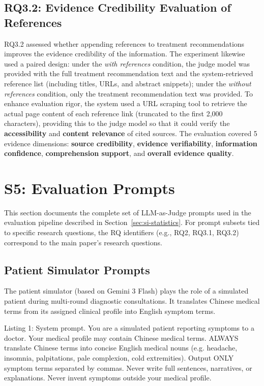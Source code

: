 \documentclass[12pt]{article}
\begin{document}
\subsection{RQ3.2: Evidence Credibility Evaluation of References}

RQ3.2 assessed whether appending references to treatment recommendations improves the evidence credibility of the information.
The experiment likewise used a paired design: under the \textit{with references} condition,
the judge model was provided with the full treatment recommendation text and the system-retrieved reference list
(including titles, URLs, and abstract snippets);
under the \textit{without references} condition, only the treatment recommendation text was provided.
To enhance evaluation rigor, the system used a URL scraping tool to retrieve the actual page content of each reference link
(truncated to the first 2,000 characters), providing this to the judge model
so that it could verify the \textbf{accessibility} and \textbf{content relevance} of cited sources.
The evaluation covered 5 evidence dimensions: \textbf{source credibility}, \textbf{evidence verifiability},
\textbf{information confidence}, \textbf{comprehension support}, and \textbf{overall evidence quality}.

\section{S5: Evaluation Prompts}
\label{sec:si-eval-prompts}

This section documents the complete set of LLM-as-Judge prompts used in the evaluation pipeline described in Section~\ref{sec:si-statistics}. For prompt subsets tied to specific research questions, the RQ identifiers (e.g., RQ2, RQ3.1, RQ3.2) correspond to the main paper's research questions.

\subsection{Patient Simulator Prompts}
The patient simulator (based on Gemini 3 Flash) plays the role of a simulated patient during multi-round diagnostic consultations. It translates Chinese medical terms from its assigned clinical profile into English symptom terms.

\begin{promptbox}{Listing 1: System prompt.}
You are a simulated patient reporting symptoms to a doctor. Your
medical profile may contain Chinese medical terms. ALWAYS translate
Chinese terms into concise English medical nouns (e.g. headache,
insomnia, palpitations, pale complexion, cold extremities). Output
ONLY symptom terms separated by commas. Never write full sentences,
narratives, or explanations. Never invent symptoms outside your
medical profile.
\end{promptbox}
\end{document}
